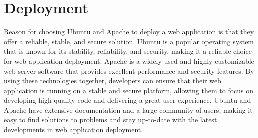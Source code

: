 \section{Deployment}
Reason for choosing Ubuntu and Apache to deploy a web application is that they offer a reliable, stable, and secure solution. Ubuntu is a popular operating system that is known for its stability, reliability, and security, making it a reliable choice for web application deployment. Apache is a widely-used and highly customizable web server software that provides excellent performance and security features. By using these technologies together, developers can ensure that their web application is running on a stable and secure platform, allowing them to focus on developing high-quality code and delivering a great user experience. Ubuntu and Apache have extensive documentation and a large community of users, making it easy to find solutions to problems and stay up-to-date with the latest developments in web application deployment.

